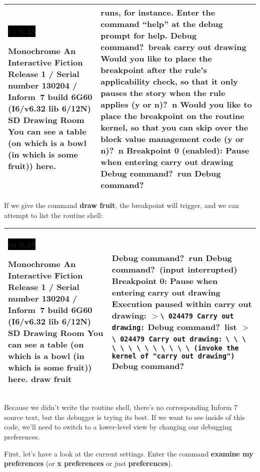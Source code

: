 \documentclass{book}
\newcommand{\n}{\hspace*{\fill}\newline}
\newcommand{\terp}[2]{\begin{center}\begin{tabular}{p{0.45\textwidth}|p{0.45\textwidth}}\midrule #1&#2\\\midrule\end{tabular}\end{center}}
\newcommand{\glkheading}[1]{\textbf{#1}}
\newcommand{\glkinput}[1]{\textbf{#1}}
\newcommand{\glkstatusline}[2]{\centerline{\colorbox{black}{\hbox to 0.45\textwidth{\textcolor{white}{#1\hfil #2}}}}}
\newcommand{\storyprompt}{\raisebox{1.5pt}{\(>\)}}
\newcommand{\cursor}{\raisebox{-1.5pt}{\RectangleThin}}
\newcommand{\markedindent}{\(>\)}
\newcommand{\unmarkedindent}{\hphantom{\(>\)}}
\begin{document}
\terp{\glkstatusline{Drawing Room}{0/1}\n
  \glkheading{Monochrome}\n
  An Interactive Fiction\n
  Release 1 / Serial number 130204 / Inform~7 build 6G60 (I6/v6.32 lib 6/12N) SD\n
  \n
  \glkheading{Drawing Room}\n
  You can see a table (on which is a bowl (in which is some fruit)) here.\n
  \n
  \storyprompt\cursor}{%
  runs, for instance.\n
  \n
  Enter the command ``help'' at the debug prompt for help.\n
  \n
  Debug command?\ \glkinput{break carry out drawing}\n
  \n
  Would you like to place the breakpoint after the rule's applicability check, so that it only pauses the story when the rule applies (y or n)?\ \glkinput{n}\n
  \n
  Would you like to place the breakpoint on the routine kernel, so that you can skip over the block value management code (y or n)?\ \glkinput{n}\n
  \n
  Breakpoint 0 (enabled): Pause when entering carry out drawing\n
  \n
  Debug command?\ \glkinput{run}\n
  \n
  Debug command?\ \cursor}

If we give the command \glkinput{draw fruit}, the breakpoint will trigger, and
we can attempt to list the routine shell:

\terp{\glkstatusline{Drawing Room}{0/1}\n
  \glkheading{Monochrome}\n
  An Interactive Fiction\n
  Release 1 / Serial number 130204 / Inform~7 build 6G60 (I6/v6.32 lib 6/12N) SD\n
  \n
  \glkheading{Drawing Room}\n
  You can see a table (on which is a bowl (in which is some fruit)) here.\n
  \n
  \storyprompt\glkinput{draw fruit}}{%
  \n
  Debug command?\ \glkinput{run}\n
  \n
  Debug command?\ (input interrupted)\n
  \n
  \glkheading{Breakpoint 0:} Pause when entering carry out drawing\n
  \n
  Execution paused within carry out drawing:\n
  \markedindent \lstinline{\ 024479 Carry out drawing:}\n
  \n
  Debug command?\ \glkinput{list}\n
  \n
  \markedindent \lstinline{\ 024479 Carry out drawing:}\n
  \unmarkedindent \lstinline{\ \ \ \ \ \ \ \ \ \ \ \ \ (invoke the kernel of "carry out drawing")}\n
  \n
  Debug command?\ \cursor}

Because we didn't write the routine shell, there's no corresponding Inform 7
source text, but the debugger is trying its best.  If we want to see inside of
this code, we'll need to switch to a lower-level view by changing our debugging
preferences.

First, let's have a look at the current settings.  Enter the command
\glkinput{examine my preferences} (or \glkinput{x preferences} or just
\glkinput{preferences}).
\end{document}
